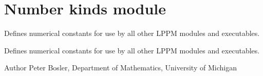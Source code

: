 \hypertarget{group___number_kinds}{\section{Number kinds module}
\label{group___number_kinds}
}


Defines numerical constants for use by all other L\+P\+P\+M modules and executables.  


Defines numerical constants for use by all other L\+P\+P\+M modules and executables. 

\begin{DoxyAuthor}{Author}
Peter Bosler, Department of Mathematics, University of Michigan 
\end{DoxyAuthor}
